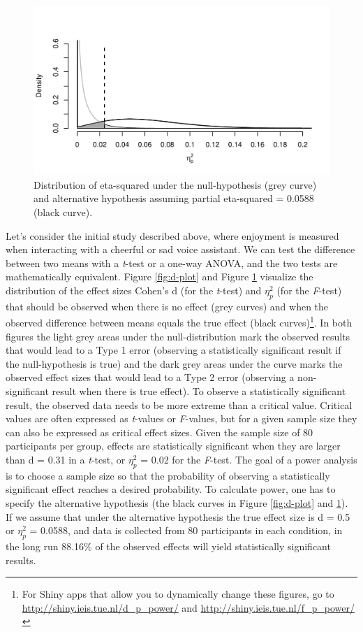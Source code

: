 \documentclass[,jou, draftfirst, a4paper,floatsintext]{apa6}
\let\rmarkdownfootnote\footnote%
\def\footnote{\protect\rmarkdownfootnote}
\begin{document}
\begin{figure}
\centering
\includegraphics{0.1_Simulation_Based_Power_Analysis_For_Factorial_ANOVA_Designs_files/figure-latex/eta-plot-1.pdf}
\caption{\label{fig:eta-plot}Distribution of eta-squared under the null-hypothesis (grey curve) and alternative hypothesis assuming partial eta-squared = 0.0588 (black curve).}
\end{figure}

Let's consider the initial study described above, where enjoyment is measured when interacting with a cheerful or sad voice assistant.
We can test the difference between two means with a \emph{t}-test or a one-way ANOVA, and the two tests are mathematically equivalent.
Figure \ref{fig:d-plot} and Figure \ref{fig:eta-plot} visualize the distribution of the effect sizes Cohen's d (for the \emph{t}-test) and \(\eta_p^2\) (for the \emph{F}-test) that should be observed when there is no effect (grey curves) and when the observed difference between means equals the true effect (black curves)\footnote{For Shiny apps that allow you to dynamically change these figures, go to \url{http://shiny.ieis.tue.nl/d_p_power/} and \url{http://shiny.ieis.tue.nl/f_p_power/}}.
In both figures the light grey areas under the null-distribution mark the observed results that would lead to a Type 1 error (observing a statistically significant result if the null-hypothesis is true) and the dark grey areas under the curve marks the observed effect sizes that would lead to a Type 2 error (observing a non-significant result when there is true effect).
To observe a statistically significant result, the observed data needs to be more extreme than a critical value.
Critical values are often expressed as \emph{t}-values or \emph{F}-values, but for a given sample size they can also be expressed as critical effect sizes.
Given the sample size of 80 participants per group, effects are statistically significant when they are larger than d = 0.31 in a \emph{t}-test, or \(\eta_p^2\) = 0.02 for the \emph{F}-test.
The goal of a power analysis is to choose a sample size so that the probability of observing a statistically significant effect reaches a desired probability.
To calculate power, one has to specify the alternative hypothesis (the black curves in Figure \ref{fig:d-plot} and \ref{fig:eta-plot}).
If we assume that under the alternative hypothesis the true effect size is d = 0.5 or \(\eta_p^2\) = 0.0588, and data is collected from 80 participants in each condition, in the long run 88.16\% of the observed effects will yield statistically significant results.
\end{document}
